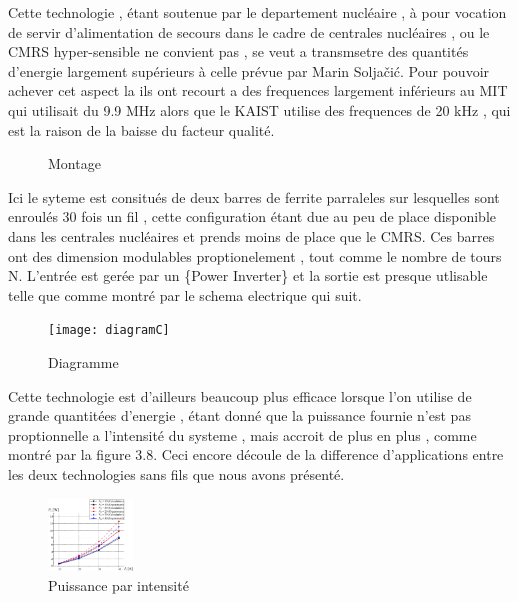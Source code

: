 \documentclass[12pt]{report}
\begin{document}
  Cette technologie , étant soutenue par le departement nucléaire , à pour vocation de servir d'alimentation de secours dans le cadre de centrales nucléaires , ou le CMRS hyper-sensible ne convient pas , se veut a transmsetre des quantités d'energie largement supérieurs à celle prévue par Marin Soljačić. Pour pouvoir achever cet aspect la ils ont recourt a des frequences largement inférieurs au MIT qui utilisait du 9.9 MHz alors que le KAIST utilise des frequences de 20 kHz , qui est la raison de la baisse du facteur qualité.
  
\begin{figure}
  \begin{center}
    \setlength\fboxsep{0pt}
    \setlength\fboxrule{0.5pt}
  \end{center}
  \caption{Montage}
\end{figure}Ici le syteme est consitués de deux barres de ferrite parraleles sur lesquelles sont enroulés 30 fois un fil , cette configuration étant due au peu de place disponible dans les centrales nucléaires et prends moins de place que le CMRS. Ces barres ont des dimension modulables proptionelement , tout comme le nombre de tours N. L'entrée est gerée par un \{Power Inverter\} et la sortie est presque utlisable telle que comme montré par le schema electrique qui suit.
\begin{figure}
  \begin{center}
    \texttt{[image: diagramC]}
  \end{center}
  \caption{Diagramme}
\end{figure}

  Cette technologie est d'ailleurs beaucoup plus efficace lorsque l'on utilise de grande quantitées d'energie , étant donné que la puissance fournie n'est pas proptionnelle a l'intensité du systeme , mais accroit de plus en plus , comme montré par la figure 3.8. Ceci encore découle de la difference d'applications entre les deux technologies sans fils que nous avons présenté.
\begin{figure}
  \begin{center}
    \includegraphics[width=0.2\textwidth]{PparI}
  \end{center}
  \caption{Puissance par intensité}
\end{figure}
\end{document}
